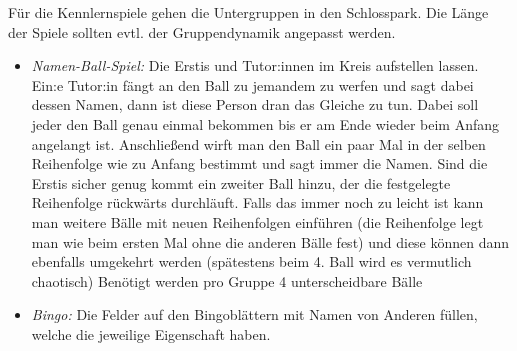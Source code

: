 \documentclass[10pt,twocolumn,ngerman]{scrartcl}
\begin{document}
Für die Kennlernspiele gehen die Untergruppen in den Schlosspark. Die Länge der
Spiele sollten evtl. der Gruppendynamik angepasst werden.  
\begin{itemize}
    \item \emph{Namen-Ball-Spiel:} Die Erstis und Tutor:innen im  Kreis
        aufstellen lassen.  Ein:e Tutor:in fängt an den Ball zu jemandem zu
        werfen und sagt dabei dessen Namen,  dann ist diese Person dran das
        Gleiche zu tun. Dabei soll jeder den Ball genau einmal bekommen bis er
        am Ende wieder beim Anfang angelangt ist. Anschließend wirft man den
        Ball ein paar Mal in der selben Reihenfolge wie zu Anfang bestimmt und
        sagt immer die Namen.  Sind die Erstis sicher genug kommt ein zweiter
        Ball hinzu,  der die festgelegte Reihenfolge rückwärts durchläuft.
        Falls das immer noch zu leicht ist kann man weitere Bälle mit neuen
        Reihenfolgen einführen (die Reihenfolge legt man wie beim ersten Mal
        ohne die anderen Bälle fest) und diese können dann  ebenfalls umgekehrt
        werden (spätestens beim 4.  Ball wird es vermutlich chaotisch) Benötigt
        werden  pro Gruppe 4 unterscheidbare Bälle 
    \item \emph{Bingo:} 
        Die Felder auf den  Bingoblättern mit Namen von
        Anderen füllen, welche die jeweilige Eigenschaft haben.


\end{itemize}
\end{document}
